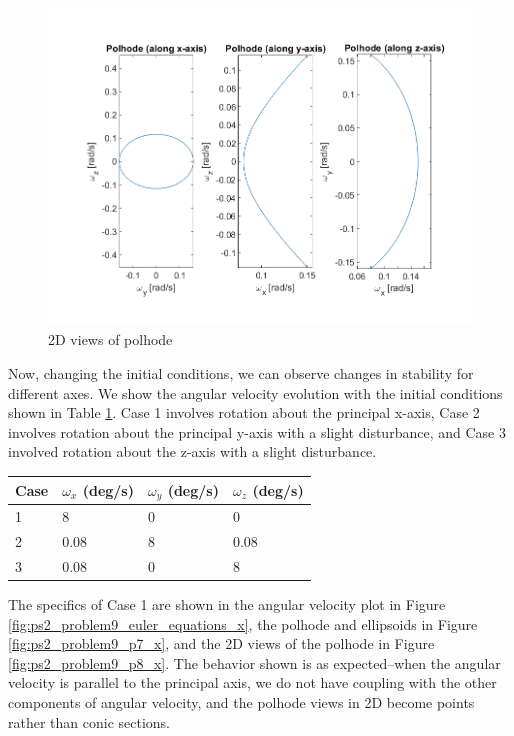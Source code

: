 \begin{figure}[H]
\centering
\includegraphics[scale=0.7]{Images/ps2_problem8.png}
\caption{2D views of polhode}
\label{fig:ps2_problem8}
\end{figure}

Now, changing the initial conditions, we can observe changes in stability for different axes. We show the angular velocity evolution with the initial conditions shown in Table \ref{tab:ps2_problem9_conditions}. Case 1 involves rotation about the principal x-axis, Case 2 involves rotation about the principal y-axis with a slight disturbance, and Case 3 involved rotation about the z-axis with a slight disturbance.

\begin{table}[H]
\centering
\label{tab:ps2_problem9_conditions}
\begin{tabular}{|l|l|l|l|}
\hline
\textbf{Case} & \textbf{$\omega_x$ (deg/s)} & \textbf{$\omega_y$ (deg/s)} & \textbf{$\omega_z$ (deg/s)} \\ \hline
1             & 8                     & 0                     & 0                     \\ \hline
2             & 0.08                  & 8                     & 0.08                  \\ \hline
3             & 0.08                  & 0                     & 8                     \\ \hline
\end{tabular}
\end{table}

The specifics of Case 1 are shown in the angular velocity plot in Figure \ref{fig:ps2_problem9_euler_equations_x}, the polhode and ellipsoids in Figure \ref{fig:ps2_problem9_p7_x}, and the 2D views of the polhode in Figure \ref{fig:ps2_problem9_p8_x}. The behavior shown is as expected–when the angular velocity is parallel to the principal axis, we do not have coupling with the other components of angular velocity, and the polhode views in 2D become points rather than conic sections.

